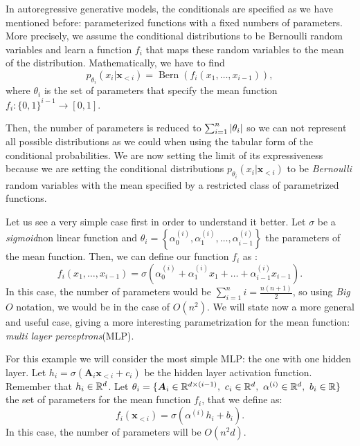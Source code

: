 In autoregressive generative models, the conditionals are specified as we have mentioned before: parameterized functions with a fixed numbers of parameters. More precisely,  we assume 
the conditional distributions to be Bernoulli random variables and learn a function $f_i$ that maps these random variables to the mean of the distribution. Mathematically, we have to find 
$$
p_{\theta_i}(x_i | \bm{x}_{<i}) = \operatorname{Bern}(f_i(x_1,\dots,x_{i-1})),
$$
where $\theta_i$ is the set of parameters that specify the mean function $f_i:\{0,1\}^{i-1} \to [0,1]$.

Then, the number of parameters is reduced to $\sum_{i=1}^n \left\lvert\theta_i\right\rvert$ so we can not represent all possible distributions as we could when using the tabular form of the conditional probabilities.
We are now setting the limit of its expressiveness because we are setting the conditional distributions $p_{\theta_i}(x_i|\bm{x}_{<i})$ to be \emph{Bernoulli} random variables with the mean specified by a restricted class 
of parametrized functions. 

Let us see a very simple case first in order to understand it better. Let $\sigma$ be a \emph{sigmoid}\footnotemark non linear function and 
$\theta_i = \left\{\alpha_{0}^{(i)},\alpha_{1}^{(i)},\dots, \alpha_{i-1}^{(i)}\right\}$ the parameters of the mean function. Then, we can define our function $f_i$ as :
$$
f_i(x_1,\dots, x_{i-1}) = \sigma(\alpha_{0}^{(i)} + \alpha_{1}^{(i)}x_1 + \dots + \alpha_{i-1}^{(i)}x_{i-1}).
$$
In this case, the number of parameters would be $\sum_{i = 1}^n i = \frac{n(n+1)}{2}$, so using \emph{Big }$O$ notation, we would be in the case of $O(n^2)$. We will state now a more general and useful case,
giving a more interesting parametrization for the mean function: \emph{multi layer perceptrons}\footnotemark (MLP).


For this example we will consider the most simple MLP: the one with one hidden layer. Let $h_i = \sigma(\bm{A}_i \bm{x}_{<i} + c_i)$ be the hidden layer activation function. Remember that $h_i \in \mathbb{R}^d$. Let
$ \theta_i = \{ \bm{A}_i \in \R^{d \times (i-1)}, \ c_i \in \R^d, \ \alpha^{(i)} \in \R^d, \ b_i \in \R\}$ the set of parameters
for the mean function $f_i$, that we define as:
$$
f_i(\bm{x}_{<i}) = \sigma(\alpha^{(i)}h_i + b_i).
$$
In this case, the number of parameters will be $O(n^2 d)$.

